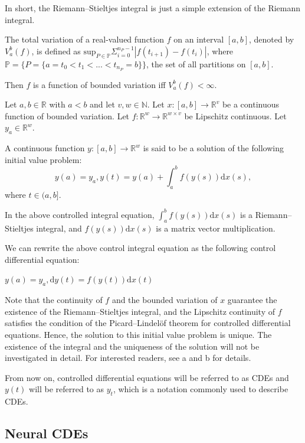 \documentclass[a4paper,11pt,titlepage]{article}
\theoremstyle{definition}
\theoremstyle{plain}
\theoremstyle{remark}
\begin{document}
In short, the Riemann–Stieltjes integral is just a simple extension of the Riemann integral.

The total variation of a real-valued function $f$ on an interval $[a,b]$, denoted by $V_a^b(f)$, is defined as $\mathrm{sup}_{P\in\mathbb{P}}\Sigma_{i=0}^{n_P-1}|f(t_{i+1})-f(t_i)|$, where $\mathbb{P}=\{P=\{a=t_0<t_1<...<t_{n_P}=b\}\}$, the set of all partitions on $[a,b]$.

Then $f$ is a function of bounded variation iff $V_a^b(f)<\infty$.

Let $a,b\in\mathbb{R}$ with $a<b$ and let $v,w\in\mathbb{N}$. Let $x:[a,b]\rightarrow\mathbb{R}^v$ be a continuous function of bounded variation. Let $f:\mathbb{R}^w\rightarrow\mathbb{R}^{w\times v}$ be Lipschitz continuous. Let $y_a\in\mathbb{R}^w$.

A continuous function $y:[a,b]\rightarrow\mathbb{R}^w$ is said to be a solution of the following initial value problem:
$$y(a)=y_a, y(t)=y(a)+\int_a^bf(y(s))\mathrm{d}x(s),$$
where $t\in(a,b].$

In the above controlled integral equation, $\int_a^bf(y(s))\mathrm{d}x(s)$ is a Riemann–Stieltjes integral, and $f(y(s))\mathrm{d}x(s)$ is a matrix vector multiplication.

We can rewrite the above control integral equation as the following control differential equation:

\begin{center}
    $y(a)=y_a, \mathrm{d}y(t) = f(y(t))\mathrm{d}x(t)$
\end{center}

Note that the continuity of $f$ and the bounded variation of $x$ guarantee the existence of the Riemann–Stieltjes integral, and the Lipschitz continuity of $f$ satisfies the condition of the Picard–Lindelöf theorem for controlled differential equations. Hence, the solution to this initial value problem is unique. The existence of the integral and the uniqueness of the solution will not be investigated in detail. For interested readers, see a and b for details.

From now on, controlled differential equations will be referred to as CDEs and $y(t)$ will be referred to as $y_t$, which is a notation commonly used to describe CDEs.

\subsection{Neural CDEs}
\end{document}
